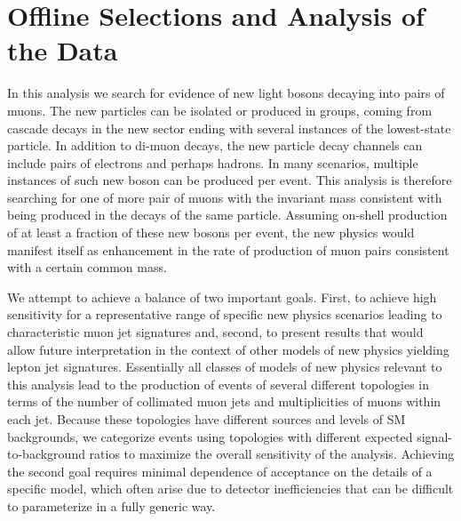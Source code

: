 \section{Offline Selections and Analysis of the Data}

In this analysis we search for evidence of new light bosons decaying into pairs of muons. The new particles can be isolated or produced in groups, coming from cascade decays in the new sector ending with several instances of the lowest-state particle. In addition to di-muon decays, the new particle decay channels can include pairs of electrons and perhaps hadrons. In many scenarios, multiple instances of such new boson can be produced per event. This analysis is therefore searching for one of more pair of muons with the invariant mass consistent with being produced in the decays of the same particle. Assuming on-shell production of at least a fraction of these new bosons per event, the new physics would manifest itself as enhancement in the rate of production of muon pairs consistent with a certain common mass. 

We attempt to achieve a balance of two important goals. First, to achieve high sensitivity for a representative range of specific new physics scenarios leading to characteristic muon jet signatures and, second, to present results that would allow future interpretation in the context of other models of new physics yielding lepton jet signatures. Essentially all classes of models of new physics relevant to this analysis lead to the production of events of several different topologies in terms of the number of collimated muon jets and multiplicities of muons within each jet. Because these topologies have different sources and levels of SM backgrounds, we categorize events using topologies with different expected signal-to-background ratios to maximize the overall sensitivity of the analysis. Achieving the second goal requires minimal dependence of acceptance on the details of a specific model, which often arise due to detector inefficiencies that can be difficult to parameterize in a fully generic way. 

